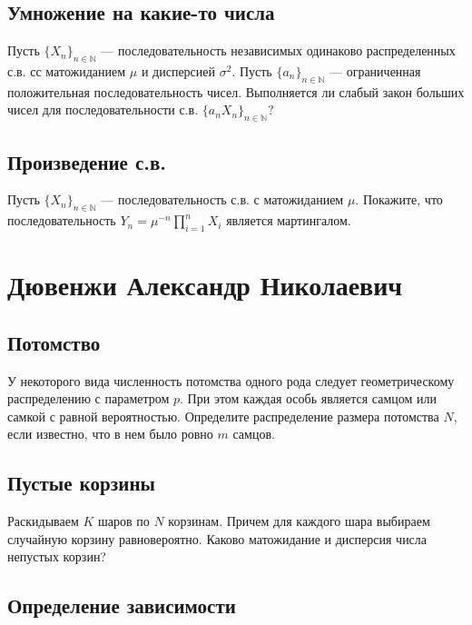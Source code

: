 \documentclass[12pt]{article}
\newcommand\N{\mathbb{N}}
\begin{document}
\subsection{Умножение на какие-то числа}

Пусть $\{X_n\}_{n \in \N}$ --- последовательность независимых одинаково распределенных с.в. сс матожиданием $\mu$ и дисперсией $\sigma^2$. Пусть $\{a_n\}_{n \in \N}$ --- ограниченная положительная последовательность чисел. Выполняется ли слабый закон больших чисел для последовательности с.в. $\{a_n X_n\}_{n \in \N}$?



\subsection{Произведение с.в.}

Пусть $\{X_n\}_{n \in \N}$ --- последовательность с.в. с матожиданием $\mu$. Покажите, что последовательность $Y_n = \mu^{-n} \prod_{i = 1}^n X_i$ является мартингалом.



\newpage
\section{Дювенжи Александр Николаевич}

\subsection{Потомство}

У некоторого вида численность потомства одного рода следует геометрическому распределению с параметром $p$. При этом каждая особь является самцом или самкой с равной вероятностью. Определите распределение размера потомства $N$, если известно, что в нем было ровно $m$ самцов.



\subsection{Пустые корзины}

Раскидываем $K$ шаров по $N$ корзинам. Причем для каждого шара выбираем случайную корзину равновероятно. Каково матожидание и дисперсия числа непустых корзин?



\subsection{Определение зависимости}
\end{document}
